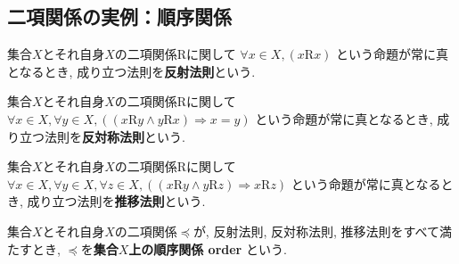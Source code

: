 \subsection{二項関係の実例：順序関係}
\begin{Def}
集合$X$とそれ自身$X$の二項関係$\mathrm{R}$に関して
$
\forall x\in X,(x\mathrm{R}x)
$
という命題が常に真となるとき,
成り立つ法則を{\bf 反射法則}という.
\end{Def}
\begin{Def}
集合$X$とそれ自身$X$の二項関係$\mathrm{R}$に関して
$
\forall x\in X,\forall y\in X, ((x\mathrm{R}y\land y\mathrm{R}x)\Rightarrow x=y)
$
という命題が常に真となるとき, 成り立つ法則を{\bf 反対称法則}という.
\end{Def}
\begin{Def}
集合$X$とそれ自身$X$の二項関係$\mathrm{R}$に関して
$
\forall x\in X,\forall y\in X,\forall z\in X, ((x\mathrm{R}y\land y\mathrm{R}z)\Rightarrow x\mathrm{R}z)
$
という命題が常に真となるとき, 成り立つ法則を{\bf 推移法則}という.
\end{Def}
\begin{Def}
集合$X$とそれ自身$X$の二項関係$\preceq$が, 反射法則, 反対称法則, 推移法則をすべて満たすとき, $\preceq$を{\bf 集合$X$上の順序関係 order}
という.
\begin{comment}
\begin{enumerate}
\item 任意の$x\in X$について$(x,x)\in \mathrm{R}$である.
\item 任意の$x\in X,y\in X$について$(x,y)\in \mathrm{R}$かつ$(y,x)\in \mathrm{R}$ならば$x=y$である.
\item 任意の$x\in X,y\in X,z\in X$について$(x,y)\in \mathrm{R}$かつ $(y,z)\in \mathrm{R}$ならば
$(x,z)\in \mathrm{R}$である.
\end{enumerate}
\end{comment}
\end{Def}
\begin{comment}
\begin{Def}
集合$X$上の順序関係が存在するとき,
{\bf 集合$X$は順序集合 orderd set\index{じゅんじょしゅうごう@順序集合}である}
という.
\end{Def}
\begin{Def}
{\bf 順序集合の元$x,y$の間に順序関係がある}という.
\end{Def}
\begin{Notation}
順序集合の元$x,y$の間に順序関係があるとき, $x\preceq y$で表す.
\end{Notation}
\end{comment}

